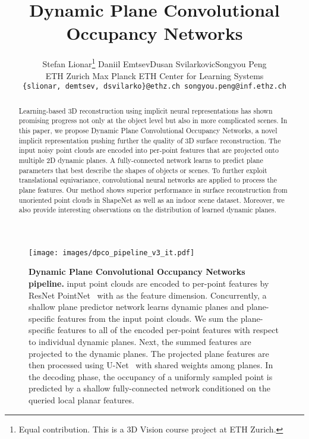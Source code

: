 \documentclass[10pt,twocolumn,letterpaper]{article}
\begin{document}
\title{Dynamic Plane Convolutional Occupancy Networks}

\author{Stefan Lionar\thanks{Equal contribution. This is a 3D Vision course project at ETH Zurich.}
\qquad Daniil Emtsev\footnotemark[1]
\qquad Dusan Svilarkovic\footnotemark[1]
\qquad Songyou Peng\\
ETH Zurich \quad  Max Planck ETH Center for Learning Systems\\
{\tt\small \{slionar, demtsev, dsvilarko\}@ethz.ch \quad songyou.peng@inf.ethz.ch}
}

\maketitle


\begin{abstract}

Learning-based 3D reconstruction using implicit neural representations has shown promising progress not only at the object level but also in more complicated scenes. In this paper, we propose Dynamic Plane Convolutional Occupancy Networks, a novel implicit representation pushing further the quality of 3D surface reconstruction. The input noisy point clouds are encoded into per-point features that are projected onto multiple 2D dynamic planes. A fully-connected network learns to predict plane parameters that best describe the shapes of objects or scenes.
To further exploit translational equivariance, convolutional neural networks are applied to process the plane features. Our method shows superior performance in surface reconstruction from unoriented point clouds in ShapeNet as well as an indoor scene dataset. Moreover, we also provide interesting observations on the distribution of learned dynamic planes.

\end{abstract}

\begin{figure*}[ht!]
\centering
\texttt{[image: images/dpco\_pipeline\_v3\_it.pdf]}
\caption{\textbf{Dynamic Plane Convolutional Occupancy Networks pipeline.}  input point clouds are encoded to per-point features by ResNet PointNet~\cite{pointnet} with  as the feature dimension. Concurrently, a shallow plane predictor network learns  dynamic planes and plane-specific features from the input point clouds. We sum the plane-specific features to all of the encoded per-point features with respect to individual dynamic planes. Next, the summed features are projected to the dynamic planes. The projected plane features are then processed using U-Net~\cite{unet} with shared weights among planes. In the decoding phase, the occupancy of a uniformly sampled point  is predicted by a shallow fully-connected network conditioned on the queried local planar features.}
\label{fig:method}
\end{figure*}
\end{document}
